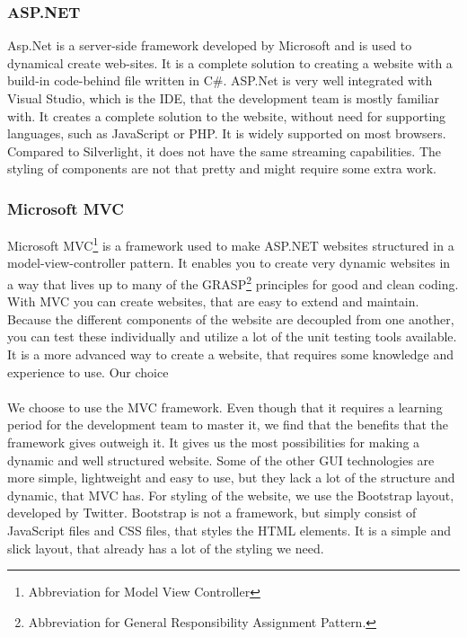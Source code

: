 \documentclass[a4paper,11pt,report]{article}
\begin{document}
\subsubsection{ASP.NET}
Asp.Net is a server-side framework developed by Microsoft and is used to dynamical create web-sites. It is a complete solution to creating a website with a build-in code-behind file written in C\#. ASP.Net is very well integrated with Visual Studio, which is the IDE, that the development team is mostly familiar with. It creates a complete solution to the website, without need for supporting languages, such as JavaScript or PHP. It is widely supported on most browsers. Compared to Silverlight, it does not have the same streaming capabilities. The styling of components are not that pretty and might require some extra work.

\subsubsection{Microsoft MVC}

Microsoft MVC\footnote{Abbreviation for Model View Controller} is a framework used to make ASP.NET websites structured in a model-view-controller pattern. It enables you to create very dynamic websites in a way that lives up to many of the GRASP\footnote{Abbreviation for General Responsibility Assignment Pattern.} principles for good and clean coding. With MVC you can create websites, that are easy to extend and maintain. Because the different components of the website are decoupled from one another, you can test these individually and utilize a lot of the unit testing tools available. It is a more advanced way to create a website, that requires some knowledge and experience to use.
Our choice
\\ \\
We choose to use the MVC framework. Even though that it requires a learning period for the development team to master it, we find that the benefits that the framework gives outweigh it.  It gives us the most possibilities for making a dynamic and well structured website. Some of the other GUI technologies are more simple, lightweight and easy to use, but they lack a lot of the structure and dynamic, that MVC has. For styling of the website, we use the Bootstrap layout, developed by Twitter. Bootstrap is not a framework, but simply consist of JavaScript files and CSS files, that styles the HTML elements. It is a simple and slick layout, that already has a lot of the styling we need.
\end{document}

